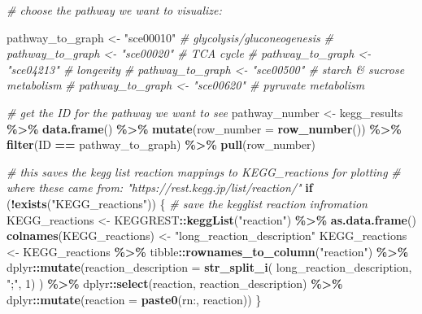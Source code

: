 \documentclass[
]{book}
\newenvironment{Shaded}{\begin{snugshade}}{\end{snugshade}}
\newcommand{\AttributeTok}[1]{\textcolor[rgb]{0.13,0.29,0.53}{#1}}
\newcommand{\CommentTok}[1]{\textcolor[rgb]{0.56,0.35,0.01}{\textit{#1}}}
\newcommand{\ControlFlowTok}[1]{\textcolor[rgb]{0.13,0.29,0.53}{\textbf{#1}}}
\newcommand{\DecValTok}[1]{\textcolor[rgb]{0.00,0.00,0.81}{#1}}
\newcommand{\FunctionTok}[1]{\textcolor[rgb]{0.13,0.29,0.53}{\textbf{#1}}}
\newcommand{\NormalTok}[1]{#1}
\newcommand{\OtherTok}[1]{\textcolor[rgb]{0.56,0.35,0.01}{#1}}
\newcommand{\SpecialCharTok}[1]{\textcolor[rgb]{0.81,0.36,0.00}{\textbf{#1}}}
\newcommand{\StringTok}[1]{\textcolor[rgb]{0.31,0.60,0.02}{#1}}
\begin{document}
\begin{Shaded}
\begin{Highlighting}[]
\CommentTok{\# choose the pathway we want to visualize:}

\NormalTok{pathway\_to\_graph }\OtherTok{\textless{}{-}} \StringTok{"sce00010"} \CommentTok{\# glycolysis/gluconeogenesis}
\CommentTok{\# pathway\_to\_graph \textless{}{-} "sce00020" \# TCA cycle}
\CommentTok{\# pathway\_to\_graph \textless{}{-} "sce04213" \# longevity}
\CommentTok{\# pathway\_to\_graph \textless{}{-} "sce00500" \# starch \& sucrose metabolism}
\CommentTok{\# pathway\_to\_graph \textless{}{-} "sce00620" \# pyruvate metabolism}

\CommentTok{\# get the ID for the pathway we want to see}
\NormalTok{pathway\_number }\OtherTok{\textless{}{-}}\NormalTok{ kegg\_results }\SpecialCharTok{\%\textgreater{}\%}
  \FunctionTok{data.frame}\NormalTok{() }\SpecialCharTok{\%\textgreater{}\%}
  \FunctionTok{mutate}\NormalTok{(}\AttributeTok{row\_number =} \FunctionTok{row\_number}\NormalTok{()) }\SpecialCharTok{\%\textgreater{}\%}
  \FunctionTok{filter}\NormalTok{(ID }\SpecialCharTok{==}\NormalTok{ pathway\_to\_graph) }\SpecialCharTok{\%\textgreater{}\%}
  \FunctionTok{pull}\NormalTok{(row\_number)}


\CommentTok{\# this saves the kegg list reaction mappings to KEGG\_reactions for plotting}
\CommentTok{\# where these came from: "https://rest.kegg.jp/list/reaction/"}
\ControlFlowTok{if}\NormalTok{ (}\SpecialCharTok{!}\FunctionTok{exists}\NormalTok{(}\StringTok{"KEGG\_reactions"}\NormalTok{)) \{}
  \CommentTok{\# save the kegglist reaction infromation}
\NormalTok{  KEGG\_reactions }\OtherTok{\textless{}{-}}\NormalTok{ KEGGREST}\SpecialCharTok{::}\FunctionTok{keggList}\NormalTok{(}\StringTok{"reaction"}\NormalTok{) }\SpecialCharTok{\%\textgreater{}\%}
    \FunctionTok{as.data.frame}\NormalTok{() }
  \FunctionTok{colnames}\NormalTok{(KEGG\_reactions) }\OtherTok{\textless{}{-}} \StringTok{"long\_reaction\_description"}
\NormalTok{  KEGG\_reactions }\OtherTok{\textless{}{-}}\NormalTok{ KEGG\_reactions }\SpecialCharTok{\%\textgreater{}\%}
\NormalTok{    tibble}\SpecialCharTok{::}\FunctionTok{rownames\_to\_column}\NormalTok{(}\StringTok{"reaction"}\NormalTok{) }\SpecialCharTok{\%\textgreater{}\%}
\NormalTok{    dplyr}\SpecialCharTok{::}\FunctionTok{mutate}\NormalTok{(}\AttributeTok{reaction\_description =} \FunctionTok{str\_split\_i}\NormalTok{(}
\NormalTok{      long\_reaction\_description, }\StringTok{";"}\NormalTok{, }\DecValTok{1}\NormalTok{)}
\NormalTok{      ) }\SpecialCharTok{\%\textgreater{}\%}
\NormalTok{    dplyr}\SpecialCharTok{::}\FunctionTok{select}\NormalTok{(reaction, reaction\_description) }\SpecialCharTok{\%\textgreater{}\%}
\NormalTok{    dplyr}\SpecialCharTok{::}\FunctionTok{mutate}\NormalTok{(}\AttributeTok{reaction =} \FunctionTok{paste0}\NormalTok{(}\StringTok{\textquotesingle{}rn:\textquotesingle{}}\NormalTok{, reaction))}
\NormalTok{\}}


\end{Highlighting}
\end{Shaded}
\end{document}
